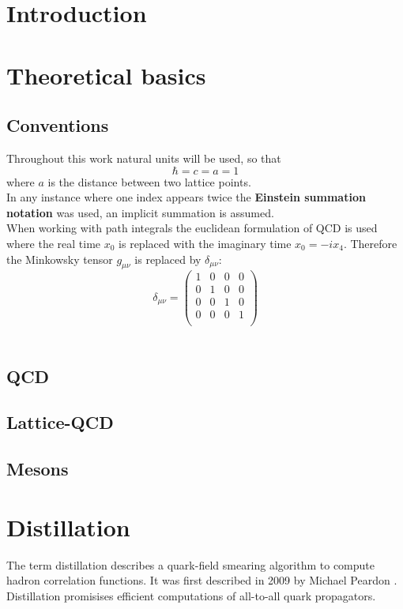 \documentclass{style}
\begin{document}
    \section{Introduction}
    
	\section{Theoretical basics}
	\subsection{Conventions}
	Throughout this work natural units will be used, so that
	$$\hbar = c = a = 1$$
	where $a$ is the distance between two lattice points.\\
	
	In any instance where one index appears twice the \textbf{Einstein summation notation} was used, an implicit summation is assumed.\\
	
	When working with path integrals the euclidean formulation of QCD is used where the real time $x_0$ is replaced with the imaginary time $x_0 = -ix_4$. Therefore the Minkowsky tensor $g_{\mu\nu}$ is replaced by $\delta_{\mu\nu}$:
	$$\delta_{\mu\nu} = 
	\begin{pmatrix}
	1 & 0 & 0 & 0 \\
	0 & 1 & 0 & 0 \\
	0 & 0 & 1 & 0 \\
	0 & 0 & 0 & 1 \\
	\end{pmatrix}
	$$\\
	\cite{Rothe2012}
	
	\subsection{QCD}
	
	\subsection{Lattice-QCD}
	
	\subsection{Mesons}
	
	\newpage
	
	\section{Distillation}
	The term distillation describes a quark-field smearing algorithm to compute hadron correlation functions. It was first described in 2009 by Michael Peardon \cite{distillation_paper}. Distillation promisises efficient computations of all-to-all quark propagators.\\
	
\end{document}
